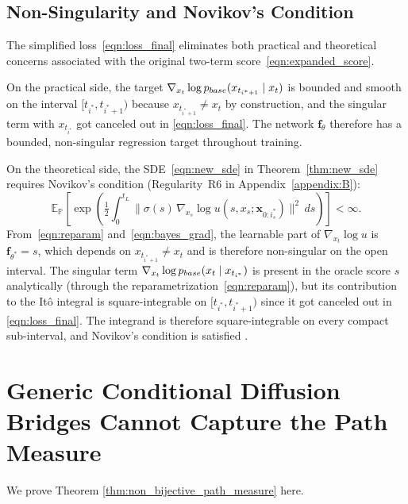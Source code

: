 \documentclass{article}
\newcommand{\pbase}{p_{\normalfont{base}}}
\newcommand{\PP}{\mathbb{P}}
\newcommand{\EE}{\mathbb{E}}
\begin{document}
\subsection{Non-Singularity and Novikov's Condition}
\label{sec:tractable_score}

The simplified loss~\eqref{eqn:loss_final} eliminates both practical and theoretical concerns associated with the original two-term score~\eqref{eqn:expanded_score}.

On the practical side, the target $\nabla_{x_t}\log\pbase(x_{t_{i^*+1}} \mid x_t)$ is bounded and smooth on the interval $[t_{i^*}, t_{i^*+1})$ because $x_{t_{i^*+1}} \ne x_t$ by construction, and the singular term with $x_{t_{i^*}}$ got canceled out in \eqref{eqn:loss_final}.  The network $\mathbf{f}_\theta$ therefore has a bounded, non-singular regression target throughout training.

On the theoretical side, the SDE~\eqref{eqn:new_sde} in Theorem~\ref{thm:new_sde} requires Novikov's condition (Regularity~R6 in Appendix~\ref{appendix:B}):
\[
  \EE_\PP\left[
    \exp\left(
      \tfrac{1}{2}\int_0^{t_L}
      \|\sigma(s)\,\nabla_{x_s}\log u(s,x_s;\mathbf{x}_{0:i^*_s})\|^2\,ds
    \right)
  \right] < \infty.
\]
From~\eqref{eqn:reparam} and~\eqref{eqn:bayes_grad}, the learnable part of $\nabla_{x_t}\log u$ is $\mathbf{f}_{\theta^*} = s$, which depends on $x_{t_{i^*+1}} \ne x_t$ and is therefore non-singular on the open interval.  The singular term $\nabla_{x_t}\log\pbase(x_t \mid x_{t_{i^*}})$ is present in the oracle score $s$ analytically (through the reparametrization~\eqref{eqn:reparam}), but its contribution to the It\^o integral is square-integrable on $[t_{i^*}, t_{i^*+1})$ since it got canceled out in \eqref{eqn:loss_final}. %
The integrand is therefore square-integrable on every compact sub-interval, and Novikov's condition is satisfied \cite{novikov1972identity, girsanov1960transforming, steele2001stochastic}.



\section{Generic Conditional Diffusion Bridges Cannot Capture the Path Measure}\label{sec:proof_hacky_bridge_bad}
We prove Theorem \ref{thm:non_bijective_path_measure} here.
\end{document}
